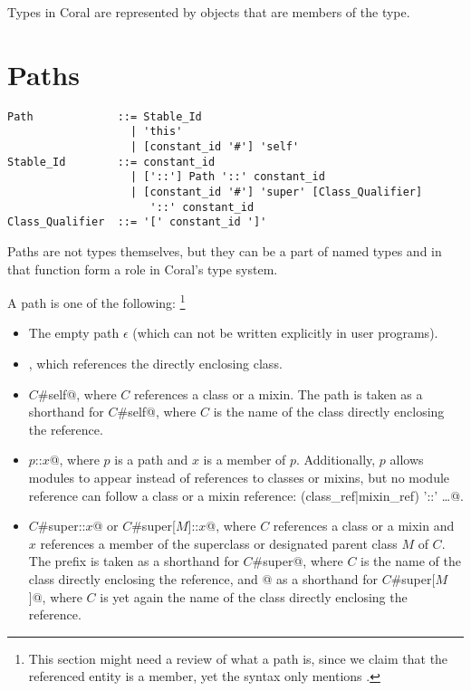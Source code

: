 Types in Coral are represented by objects that are members of the  type. 

\section{Paths}
\label{sec:type-paths}

\syntax\begin{lstlisting}
Path             ::= Stable_Id
                   | 'this'
                   | [constant_id '#'] 'self'
Stable_Id        ::= constant_id
                   | ['::'] Path '::' constant_id
                   | [constant_id '#'] 'super' [Class_Qualifier] 
                      '::' constant_id
Class_Qualifier  ::= '[' constant_id ']'
\end{lstlisting}

Paths are not types themselves, but they can be a part of named types and in that function form a role in Coral's type system. 

A path is one of the following: \footnote{This section might need a review of what a path is, since we claim that the referenced entity is a member, yet the syntax only mentions .}

\begin{itemize}
\item 
The empty path $\epsilon$ (which can not be written explicitly in user programs). 

\item 
{}, which references the directly enclosing class. 

\item 
\lstinline@$C$#self@, where $C$ references a class or a mixin. The path  is taken as a shorthand for \lstinline@$C$#self@, where $C$ is the name of the class directly enclosing the reference. 

\item 
\lstinline@$p$::$x$@, where $p$ is a path and $x$ is a member of $p$. Additionally, $p$ allows modules to appear instead of references to classes or mixins, but no module reference can follow a class or a mixin reference:  {(class_ref|mixin_ref) '::'} …@. 

\item
\lstinline@$C$#super::$x$@ or \lstinline@$C$#super[$M$]::$x$@, where $C$ references a class or a mixin and $x$ references a member of the superclass or designated parent class $M$ of $C$. The prefix  is taken as a shorthand for \lstinline@$C$#super@, where $C$ is the name of the class directly enclosing the reference, and \lstinline@super[$M$]@ as a shorthand for \lstinline@$C$#super[$M$]@, where $C$ is yet again the name of the class directly enclosing the reference. 
\end{itemize}

